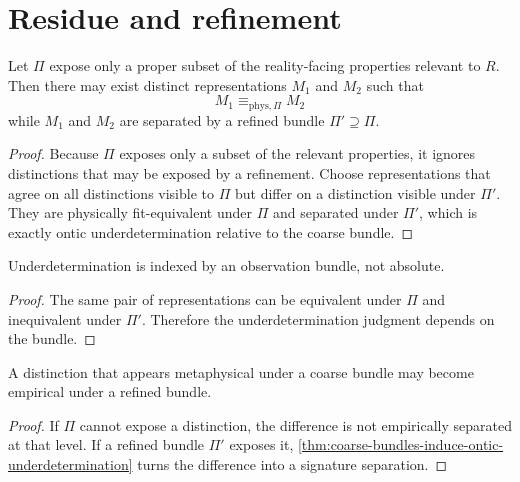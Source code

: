 \section{Residue and refinement}
\label{sec:ontic-residue-refinement}

\begin{theorem}
\label{thm:coarse-bundles-induce-ontic-underdetermination}
Let $\Pi$ expose only a proper subset of the reality-facing properties relevant to $R$. Then there may exist distinct representations $M_1$ and $M_2$ such that
$$
M_1\equiv_{\mathrm{phys},\Pi}M_2
$$
while $M_1$ and $M_2$ are separated by a refined bundle $\Pi'\supseteq\Pi$.
\end{theorem}

\begin{proof}
Because $\Pi$ exposes only a subset of the relevant properties, it ignores distinctions that may be exposed by a refinement. Choose representations that agree on all distinctions visible to $\Pi$ but differ on a distinction visible under $\Pi'$. They are physically fit-equivalent under $\Pi$ and separated under $\Pi'$, which is exactly ontic underdetermination relative to the coarse bundle.
\end{proof}

\begin{corollary}
\label{cor:underdetermination-bundle-relative}
Underdetermination is indexed by an observation bundle, not absolute.
\end{corollary}

\begin{proof}
The same pair of representations can be equivalent under $\Pi$ and inequivalent under $\Pi'$. Therefore the underdetermination judgment depends on the bundle.
\end{proof}

\begin{corollary}
\label{cor:refinement-makes-ambiguity-empirical}
A distinction that appears metaphysical under a coarse bundle may become empirical under a refined bundle.
\end{corollary}

\begin{proof}
If $\Pi$ cannot expose a distinction, the difference is not empirically separated at that level. If a refined bundle $\Pi'$ exposes it, \autoref{thm:coarse-bundles-induce-ontic-underdetermination} turns the difference into a signature separation.
\end{proof}

